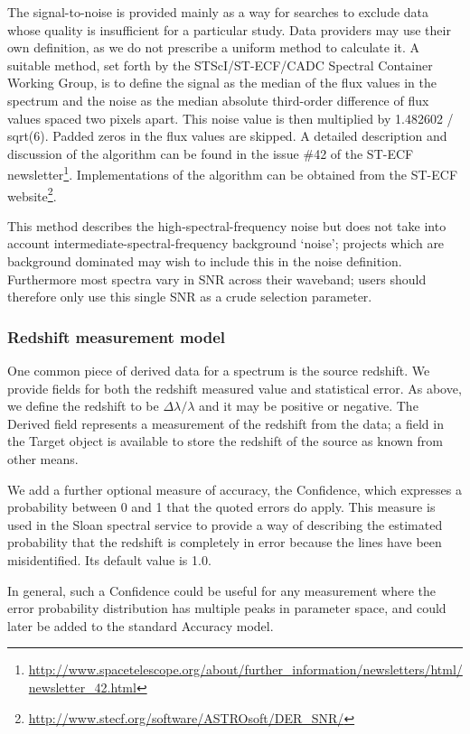 \documentclass[11pt]{article}
\begin{document}
The signal-to-noise is provided mainly as a way for searches to
exclude data whose quality is insufficient for a particular
study. Data providers may use their own definition, as we do not
prescribe a uniform method to calculate it. A suitable method,
set forth by the STScI/ST-ECF/CADC Spectral Container Working Group, is
to define the signal as the median of the flux values in the spectrum
and the noise as the median absolute third-order difference of flux
values spaced two pixels apart. This noise value is then multiplied by
1.482602 / sqrt(6). Padded zeros in the flux values are skipped. A
detailed description and discussion of the algorithm can be found in the
issue \#42 of the ST-ECF newsletter\footnote{
\url{http://www.spacetelescope.org/about/further_information/newsletters/html/newsletter_42.html}}.
Implementations of the algorithm can be obtained from the ST-ECF website\footnote{\url{http://www.stecf.org/software/ASTROsoft/DER_SNR/}}. 

This method describes the high-spectral-frequency noise
but does not take into account intermediate-spectral-frequency 
background `noise'; projects which are background dominated
may wish to include this in the noise definition. Furthermore
most spectra vary in SNR across their waveband; users
should therefore only use this single SNR as a crude selection
parameter.


\subsubsection{Redshift measurement model}  

One common piece of derived data for a spectrum is the source redshift.
We provide fields for both the redshift measured value and statistical error.
As above, we define the redshift to be $\Delta\lambda/\lambda$ and it
may be positive or negative. The Derived field represents a measurement
of the redshift from the data; a field in the Target object is available
to store the redshift of the source as known from other means. 

We add a further optional measure of accuracy, the Confidence, which expresses
a probability between 0 and 1 that the quoted errors do apply. This measure
is used in the Sloan spectral service to provide a way of describing the
estimated probability that the redshift is completely in error because
the lines have been misidentified. Its default value is 1.0.

In general, such a Confidence could be useful for any measurement where
the error probability distribution has multiple peaks in parameter
space, and could later be added to the standard Accuracy model.
\end{document}
